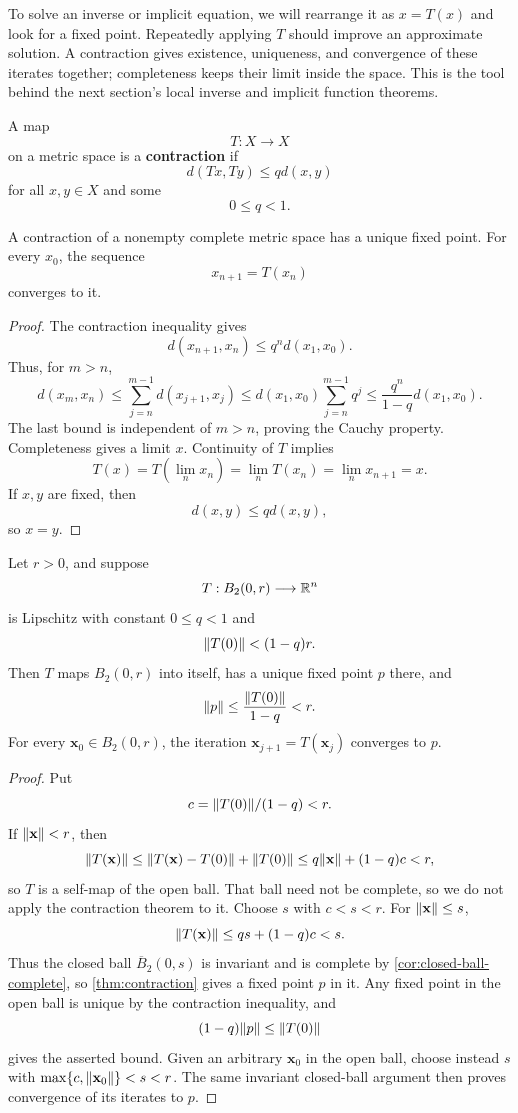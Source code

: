 To solve an inverse or implicit equation, we will rearrange it as
$x=T(x)$ and look for a fixed point. Repeatedly applying $T$ should
improve an approximate solution. A contraction gives existence, uniqueness,
and convergence of these iterates together; completeness keeps their limit
inside the space. This is the tool behind the next section's local
inverse and implicit function theorems.


\begin{definition}[Contraction]
A map
\[
T:X\longrightarrow X
\]
on a metric space is a \textbf{contraction} if
\[
d(Tx,Ty)\leq qd(x,y)
\]
for all $x,y\in X$ and some
\[
0\leq q<1.
\]
\end{definition}

\begin{theorem}
\label{thm:contraction}
A contraction of a nonempty complete metric space has a unique fixed point.  For every
$x_0$, the sequence
\[
x_{n+1}=T(x_n)
\]
converges to it.
\end{theorem}
\begin{proof}
The contraction inequality gives
\[
d(x_{n+1},x_n)\leq q^nd(x_1,x_0).
\]
Thus, for $m>n$,
\[
d(x_m,x_n)\leq\sum_{j=n}^{m-1}d(x_{j+1},x_j)
\leq d(x_1,x_0)\sum_{j=n}^{m-1}q^j
\leq\frac{q^n}{1-q}d(x_1,x_0).
\]
The last bound is independent of $m>n$, proving the Cauchy property. Completeness gives a limit $x$.  Continuity of $T$ implies
\[
T(x)=T(\lim_n x_n)=\lim_n T(x_n)=\lim_n x_{n+1}=x.
\]
If $x,y$ are fixed, then
\[
d(x,y)\leq qd(x,y),
\]
so $x=y$.
\end{proof}

\begin{corollary}
\label{cor:open-ball-contraction}
Let $r>0$, and suppose
\[
T:B_2(0,r)\longrightarrow\mathbb{R}^n
\]
is Lipschitz with constant $0\leq q<1$ and
\[
\lVert T(0)\rVert<(1-q)r.
\]
Then $T$ maps $B_2(0,r)$ into itself, has a unique fixed point $p$ there,
and
\[
\lVert p\rVert\leq\frac{\lVert T(0)\rVert}{1-q}<r.
\]
For every $\mathbf{x}_0\in B_2(0,r)$, the iteration $\mathbf{x}_{j+1}=T(\mathbf{x}_j)$ converges to
$p$.
\end{corollary}
\begin{proof}
Put
\[
c=\lVert T(0)\rVert/(1-q)<r.
\]
 If $\lVert \mathbf{x}\rVert<r$, then
\[
\lVert T(\mathbf{x})\rVert\leq\lVert T(\mathbf{x})-T(0)\rVert+\lVert T(0)\rVert
\leq q\lVert \mathbf{x}\rVert+(1-q)c<r,
\]
so $T$ is a self-map of the open ball. That ball need not be complete, so
we do not apply the contraction theorem to it. Choose $s$ with
$c<s<r$. For $\lVert \mathbf{x}\rVert\leq s$,
\[
\lVert T(\mathbf{x})\rVert\leq qs+(1-q)c<s.
\]
Thus the closed ball $\overline B_2(0,s)$ is invariant and is complete by
\cref{cor:closed-ball-complete}, so
\cref{thm:contraction} gives a fixed point $p$ in it. Any fixed point in
the open ball is unique by the contraction inequality, and
\[
(1-q)\lVert p\rVert\leq\lVert T(0)\rVert
\]
gives the asserted bound. Given an arbitrary $\mathbf{x}_0$ in the open ball,
choose instead $s$ with $\max\{c,\lVert \mathbf{x}_0\rVert\}<s<r$. The same invariant
closed-ball argument then proves convergence of its iterates to $p$.
\end{proof}

